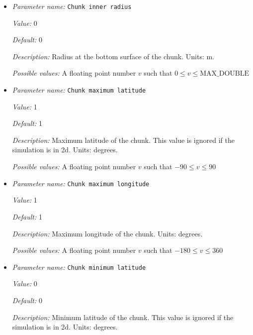 \begin{itemize}
\item {\it Parameter name:} {\tt Chunk inner radius}
\label{parameters:Geometry model/Chunk/Chunk inner radius}


{\it Value:} 0


{\it Default:} 0


{\it Description:} Radius at the bottom surface of the chunk. Units: m.


{\it Possible values:} A floating point number $v$ such that $0 \leq v \leq \text{MAX\_DOUBLE}$
\item {\it Parameter name:} {\tt Chunk maximum latitude}
\label{parameters:Geometry model/Chunk/Chunk maximum latitude}


{\it Value:} 1


{\it Default:} 1


{\it Description:} Maximum latitude of the chunk. This value is ignored if the simulation is in 2d. Units: degrees.


{\it Possible values:} A floating point number $v$ such that $-90 \leq v \leq 90$
\item {\it Parameter name:} {\tt Chunk maximum longitude}
\label{parameters:Geometry model/Chunk/Chunk maximum longitude}


{\it Value:} 1


{\it Default:} 1


{\it Description:} Maximum longitude of the chunk. Units: degrees.


{\it Possible values:} A floating point number $v$ such that $-180 \leq v \leq 360$
\item {\it Parameter name:} {\tt Chunk minimum latitude}
\label{parameters:Geometry model/Chunk/Chunk minimum latitude}


{\it Value:} 0


{\it Default:} 0


{\it Description:} Minimum latitude of the chunk. This value is ignored if the simulation is in 2d. Units: degrees.



\end{itemize}
